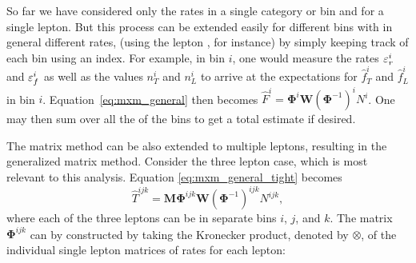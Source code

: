 So far we have considered only the rates
in a single category or bin and for a single lepton. 
But this process can be extended easily for different bins with in general different rates, 
(using the lepton \pt, for instance)
by simply keeping track of each bin using an index. For example,
in bin $i$, one would measure the rates $\varepsilon_r^i$ and $\varepsilon_f^i$
as well as the values $n_T^i$ and $n_L^i$ to arrive at the expectations
for $\hat{f}^i_T$ and $\hat{f}^i_L$ in bin $i$.
Equation~\eqref{eq:mxm_general} then becomes 
$\hat{F}^i = \mathbf{\Phi}^i\mathbf{W}(\mathbf{\Phi}^{-1})^i N^i$.
One may then sum over all the of the bins to get a total estimate
if desired.

The matrix method can be also extended to multiple leptons,
resulting in the generalized matrix method. 
Consider the three lepton case, which is most relevant to this
analysis. 
Equation \eqref{eq:mxm_general_tight} becomes
\begin{equation}
\hat{T}^{ijk} = \mathbf{M}\mathbf{\Phi}^{ijk}\mathbf{W}(\mathbf{\Phi}^{-1})^{ijk} N^{ijk},
\end{equation}
where each of the three leptons can be in separate bins $i$, $j$, and $k$.
The matrix $\mathbf{\Phi}^{ijk}$
can by constructed by taking the Kronecker product, denoted by $\otimes$,
of the individual single lepton matrices of rates for each lepton:

